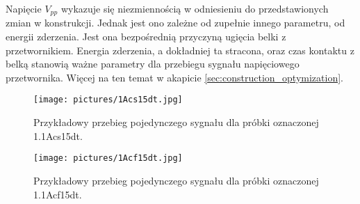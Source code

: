 Napięcie $V_{pp}$ wykazuje się niezmiennością w odniesieniu do przedstawionych zmian w konstrukcji. Jednak jest ono zależne od zupełnie innego parametru, od energii zderzenia. Jest ona bezpośrednią przyczyną ugięcia belki z przetwornikiem. Energia zderzenia, a dokładniej ta stracona, oraz czas kontaktu z belką stanowią ważne parametry dla przebiegu sygnału napięciowego przetwornika. Więcej na ten temat w akapicie \ref{sec:construction_optymization}.

\begin{figure}[htbp]
\centering
\texttt{[image: pictures/1Acs15dt.jpg]}
\caption{Przykładowy przebieg pojedynczego sygnału dla próbki oznaczonej 1.1Acs15dt.}
\label{fig:scope_without_silencer}
\end{figure}

\begin{figure}[htbp]
\centering
\texttt{[image: pictures/1Acf15dt.jpg]}
\caption{Przykładowy przebieg pojedynczego sygnału dla próbki oznaczonej 1.1Acf15dt.}
\label{fig:scope_with_silencer}
\end{figure}

